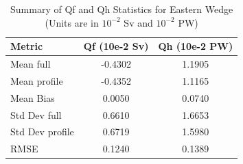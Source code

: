 \begin{table}[h!]
\centering
\caption{Summary of Qf and Qh Statistics for Eastern Wedge (Units are in $10^{-2}$ Sv and $10^{-2}$ PW)}
\label{tab:stats_summary_Eastern_Wedge}
\begin{tabular}{|l|c|c|}
\hline
Metric & Qf (10e-2 Sv) & Qh (10e-2 PW) \\
\hline
\hline
Mean full & -0.4302 & 1.1905 \\
Mean profile & -0.4352 & 1.1165 \\
Mean Bias & 0.0050 & 0.0740 \\
\hline
Std Dev full & 0.6610 & 1.6653 \\
Std Dev profile & 0.6719 & 1.5980 \\
RMSE & 0.1240 & 0.1389 \\
\hline
\end{tabular}
\end{table}
